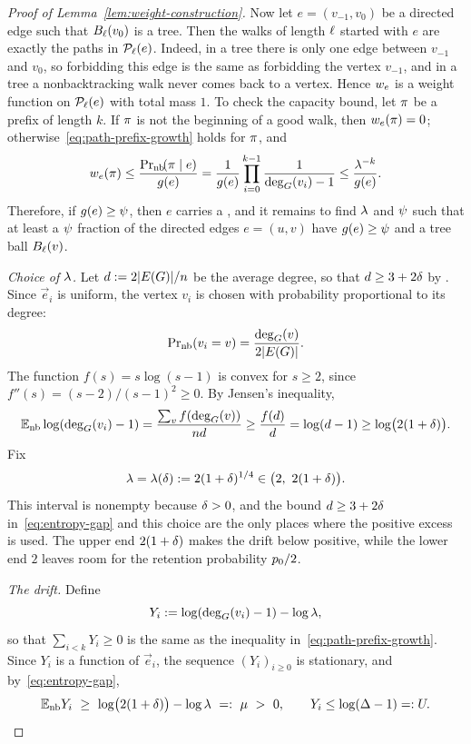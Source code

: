 \begin{proof}[Proof of Lemma~\ref{lem:weight-construction}]
Now let \(e=(v_{-1},v_0)\) be a directed edge such that \(B_{\ell}(v_0)\) is
a tree. Then the walks of length \(\ell\) started with \(e\) are exactly the
paths in \(\mathcal{P}_{\ell}(e)\). Indeed, in a tree there is only one edge between
\(v_{-1}\) and \(v_0\), so forbidding this edge is the same as forbidding the
vertex \(v_{-1}\), and in a tree a nonbacktracking walk never comes back to a
vertex. Hence \(w_{e}\) is a weight function on \(\mathcal{P}_{\ell}(e)\) with total mass
\(1\). To check the capacity bound, let \(\pi\) be a prefix of length \(k\).
If \(\pi\) is not the beginning of a good walk, then \(w_{e}(\pi)=0\);
otherwise~\eqref{eq:path-prefix-growth} holds for \(\pi\), and
\begin{equation}\label{eq:finite-flow-bound}
  \wt{e}(\pref)
  \le \frac{\Prx[\mathrm{nb}]{\pref\mid e}}{g(e)}
  =\frac{1}{g(e)}\prod_{i=0}^{k-1}\frac{1}{\dg{\Gin}{v_i}-1}
  \le \frac{\brnum^{-k}}{g(e)} .
\end{equation}
Therefore, if \(g(e)\ge\psi\), then \(e\) carries a \flowt{\brnum}{\gfrac},
and it remains to find \(\lambda\) and \(\psi\) such that at least a \(\psi\)
fraction of the directed edges \(e=(u,v)\) have \(g(e)\ge\psi\) and a tree
ball \(B_{\ell}(v)\).

\emph{Choice of \(\lambda\).} Let \(d:=2|E(G)|/n\) be the average degree,
so that \(d\ge3+2\delta\) by \Hyp{}. Since \(\vec e_i\) is uniform, the vertex
\(v_i\) is chosen with probability proportional to its degree:
\[
  \Prx[\mathrm{nb}]{v_i=v}=\frac{\dg{\Gin}{v}}{2|E(\Gin)|}.
\]
The function \(f(s)=s\log(s-1)\) is convex for \(s\ge2\), since
\(f''(s)=(s-2)/(s-1)^2\ge0\). By Jensen's inequality,
\begin{equation}\label{eq:entropy-gap}
  \mathbb{E}_{\mathrm{nb}}\log(\deg_{G}(v_i)-1)
  =\frac{\sum_v f(\deg_{G}(v))}{n d}
  \ge\frac{f(d)}{d}
  =\log(d-1)
  \ge\log\bigl(2(1+\delta)\bigr).
\end{equation}
Fix
\begin{equation}\label{eq:lambda-choice}
  \brnum=\brnum(\excd):=2(1+\excd)^{1/4}\in\bigl(2,\ 2(1+\excd)\bigr).
\end{equation}
This interval is nonempty because \(\delta>0\), and the bound
\(d\ge3+2\delta\) in~\eqref{eq:entropy-gap} and this choice are the only places
where the positive excess is used. The upper end \(2(1+\delta)\) makes the drift
below positive, while the lower end \(2\) leaves room for the retention
probability \(p_0/2\).

\emph{The drift.} Define
\[
  Y_i:=\log(\deg_{G}(v_i)-1)-\log\lambda ,
\]
so that \(\sum_{i<k}Y_i\ge0\) is the same as the inequality
in~\eqref{eq:path-prefix-growth}. Since \(Y_i\) is a function of
\(\vec e_i\), the sequence \((Y_i)_{i\ge0}\) is stationary, and
by~\eqref{eq:entropy-gap},
\[
  \E_{\mathrm{nb}} Y_i\ \ge\ \log\bigl(2(1+\excd)\bigr)-\log\brnum
  \ =:\ \drift\ >\ 0,
  \qquad
  Y_i\le\log(\degb-1)=:\ubd .
\]


\end{proof}
